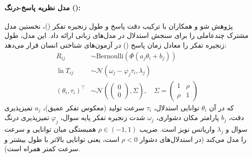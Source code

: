 \paragraph*{مدل نظریه پاسخ-درنگ ():}
پژوهش شو و همکاران \cite{xu2026latency} با ترکیب دقت پاسخ و طول زنجیره تفکر ()، نخستین مدل مشترک چندعاملی را برای سنجش استدلال در مدل‌های زبانی ارائه داد. این مدل، طول زنجیره تفکر را معادل زمان پاسخ () در آزمون‌های شناختی انسان قرار می‌دهد:
\begin{align}
    R_{ij} &\sim \text{Bernoulli}(\Phi(a_j \theta_i + b_j)) \label{eq:lart_r}\\
    \ln T_{ij} &\sim \mathcal{N}(\omega_j - \varphi_j \tau_i, \lambda_j) \label{eq:lart_t}\\
    (\theta_i, \tau_i)^\top &\sim \mathcal{N}\left(\begin{pmatrix} 0 \\ 0 \end{pmatrix}, \Sigma\right), \quad \Sigma = \begin{pmatrix} 1 & \rho \\ \rho & 1 \end{pmatrix} \label{eq:lart_prior}
\end{align}
که در آن $\theta_i$ توانایی استدلال، $\tau_i$ سرعت تولید (معکوس تفکر عمیق)، $a_j$ تمیزپذیری دقت، $b_j$ پارامتر مکان دشواری، $\omega_j$ شدت زنجیره تفکر پایه سوال، $\varphi_j$ تمیزپذیری درنگ سوال و $\lambda_j$ واریانس نویز است. ضریب $\rho \in (-1, 1)$ همبستگی میان توانایی و سرعت را مدل می‌کند (در استدلال‌های دشوار $\rho < 0$ است، یعنی توانایی بالاتر با طول  بیشتر و سرعت کمتر همراه است).

